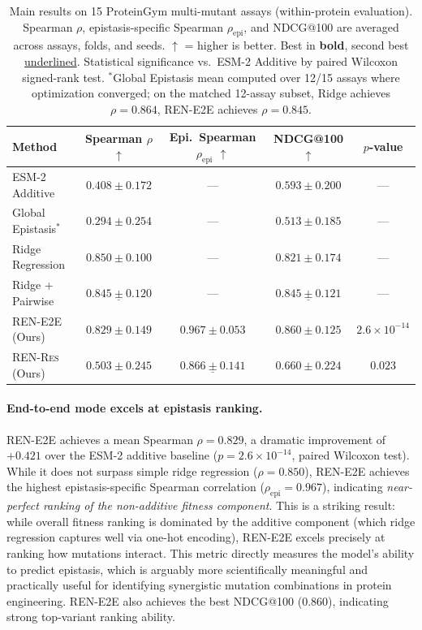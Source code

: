 \documentclass{article}
\newcommand{\rene}{\textsc{REN-E2E}}
\newcommand{\renr}{\textsc{REN-Res}}
\newcommand{\spearman}{\rho}
\begin{document}
\begin{table}[t]
\caption{Main results on 15 ProteinGym multi-mutant assays (within-protein evaluation). Spearman $\spearman$, epistasis-specific Spearman $\spearman_\text{epi}$, and NDCG@100 are averaged across assays, folds, and seeds. $\uparrow$ = higher is better. Best in \textbf{bold}, second best \underline{underlined}. Statistical significance vs.\ ESM-2 Additive by paired Wilcoxon signed-rank test. $^*$Global Epistasis mean computed over 12/15 assays where optimization converged; on the matched 12-assay subset, Ridge achieves $\rho = 0.864$, \rene{} achieves $\rho = 0.845$.}
\label{tab:main}
\centering
\small
\begin{tabular}{lcccc}
\toprule
Method & Spearman $\spearman$ $\uparrow$ & Epi.\ Spearman $\spearman_\text{epi}$ $\uparrow$ & NDCG@100 $\uparrow$ & $p$-value \\
\midrule
ESM-2 Additive & $0.408 \pm 0.172$ & --- & $0.593 \pm 0.200$ & --- \\
Global Epistasis$^*$ & $0.294 \pm 0.254$ & --- & $0.513 \pm 0.185$ & --- \\
\midrule
Ridge Regression & $\mathbf{0.850 \pm 0.100}$ & --- & $0.821 \pm 0.174$ & --- \\
Ridge + Pairwise & $\underline{0.845 \pm 0.120}$ & --- & $\underline{0.845 \pm 0.121}$ & --- \\
\rene{} (Ours) & $0.829 \pm 0.149$ & $\mathbf{0.967 \pm 0.053}$ & $\mathbf{0.860 \pm 0.125}$ & $2.6 \times 10^{-14}$ \\
\renr{} (Ours) & $0.503 \pm 0.245$ & $\underline{0.866 \pm 0.141}$ & $0.660 \pm 0.224$ & $0.023$ \\
\bottomrule
\end{tabular}
\end{table}

\paragraph{End-to-end mode excels at epistasis ranking.} \rene{} achieves a mean Spearman $\spearman = 0.829$, a dramatic improvement of $+0.421$ over the ESM-2 additive baseline ($p = 2.6 \times 10^{-14}$, paired Wilcoxon test). While it does not surpass simple ridge regression ($\spearman = 0.850$), \rene{} achieves the highest epistasis-specific Spearman correlation ($\spearman_\text{epi} = 0.967$), indicating \emph{near-perfect ranking of the non-additive fitness component}. This is a striking result: while overall fitness ranking is dominated by the additive component (which ridge regression captures well via one-hot encoding), \rene{} excels precisely at ranking how mutations interact. This metric directly measures the model's ability to predict epistasis, which is arguably more scientifically meaningful and practically useful for identifying synergistic mutation combinations in protein engineering. \rene{} also achieves the best NDCG@100 ($0.860$), indicating strong top-variant ranking ability.
\end{document}
